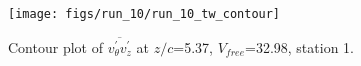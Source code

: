 \begin{figure}[H]
\centering
\texttt{[image: figs/run\_10/run\_10\_tw\_contour]}
\caption{Contour plot of $\overline{v_{\theta}^{\prime} v_{z}^{\prime}}$ at $z/c$=5.37, $V_{free}$=32.98, station 1.}
\label{fig:run_10_tw_contour}
\end{figure}


